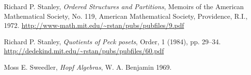 \documentclass[12pt]{article}
\theoremstyle{plain}
\theoremstyle{definition}
\theoremstyle{remark}
\begin{document}
\begin{thebibliography}{10}
Richard P. Stanley, \textit{Ordered Structures and
Partitions}, Memoirs of the American Mathematical Society, No. 119, American
Mathematical Society, Providence, R.I., 1972. \newline
\url{http://www-math.mit.edu/~rstan/pubs/pubfiles/9.pdf}

Richard P. Stanley,
\textit{Quotients of Peck posets}, Order, 1 (1984), pp. 29--34. \newline
\url{http://dedekind.mit.edu/~rstan/pubs/pubfiles/60.pdf}

Moss E. Sweedler, \textit{Hopf Algebras},
W. A. Benjamin 1969.

\end{thebibliography}
\end{document}
